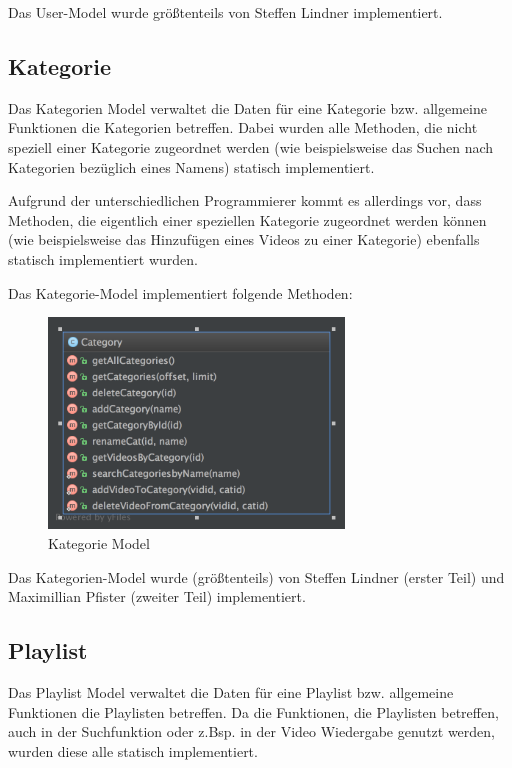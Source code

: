 \pm

 Das User-Model wurde größtenteils von Steffen Lindner implementiert.

\subsection{Kategorie}

Das Kategorien Model verwaltet die Daten für eine Kategorie bzw. allgemeine Funktionen die Kategorien betreffen. Dabei wurden alle Methoden, die nicht speziell einer Kategorie zugeordnet werden (wie beispielsweise das Suchen nach Kategorien bezüglich eines Namens) statisch implementiert. 

\pm

Aufgrund der unterschiedlichen Programmierer kommt es allerdings vor, dass Methoden, die eigentlich einer speziellen Kategorie zugeordnet werden können (wie beispielsweise das Hinzufügen eines Videos zu einer Kategorie) ebenfalls statisch implementiert wurden.

\pm

Das Kategorie-Model implementiert folgende Methoden:

\begin{figure}[H]
		\centering
        \includegraphics[width=0.7\textwidth]{./UML/Category.png}
    \caption{Kategorie Model}
\end{figure}

 Das Kategorien-Model wurde (größtenteils) von Steffen Lindner (erster Teil) und Maximillian Pfister (zweiter Teil) implementiert.


\subsection{Playlist}

Das Playlist Model verwaltet die Daten für eine Playlist bzw. allgemeine Funktionen die Playlisten betreffen. Da die Funktionen, die Playlisten betreffen, auch in der Suchfunktion oder z.Bsp. in der Video Wiedergabe genutzt werden, wurden diese alle statisch implementiert.

